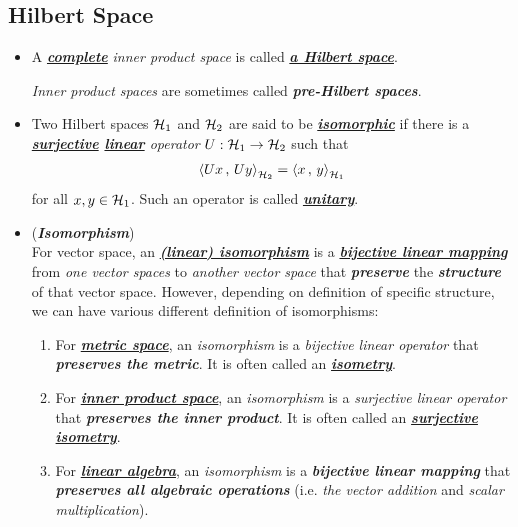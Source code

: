\documentclass[11pt]{article}
\begin{document}
\subsection{Hilbert Space}
\begin{itemize}
\item \begin{definition}
A \underline{\textbf{\emph{complete}}} \emph{inner product space} is called \underline{\emph{\textbf{a Hilbert space}}}. 

\emph{Inner product spaces} are sometimes called \emph{\textbf{pre-Hilbert spaces}}.
\end{definition}

\item \begin{definition}
Two Hilbert spaces ${\mathcal H}_1$ and ${\mathcal H}_2$ are said to be \underline{\emph{\textbf{isomorphic}}} if there is a \emph{\textbf{\underline{surjective} \underline{linear}} operator} $U: {\mathcal H}_1 \rightarrow {\mathcal H}_2$ such that 
\begin{align*}
\left\langle Ux\,,\, Uy \right\rangle_{{\mathcal H}_2} = \left\langle x\,,\, y \right\rangle_{{\mathcal H}_1}
\end{align*}  for all $x, y \in {\mathcal H}_1$. Such an operator is called \underline{\emph{\textbf{unitary}}}.
\end{definition}

\item \begin{remark} (\emph{\textbf{Isomorphism}})\\
For vector space, an \underline{\emph{\textbf{(linear) isomorphism}}} is a \underline{\emph{\textbf{bijective linear mapping}}} from \emph{one vector spaces} to \emph{another vector space} that \emph{\textbf{preserve}} the \emph{\textbf{structure}} of that vector space. However, depending on definition of specific structure, we can have various different definition of isomorphisms:
\begin{enumerate}
\item For \underline{\emph{\textbf{metric space}}}, an \emph{isomorphism} is a \emph{bijective linear operator} that \emph{\textbf{preserves the metric}}. It is often called an \underline{\emph{\textbf{isometry}}}.
\item For \underline{\emph{\textbf{inner product space}}}, an \emph{isomorphism} is a \emph{surjective linear operator} that \emph{\textbf{preserves the inner product}}. It is often called an \underline{\emph{\textbf{surjective isometry}}}.
\item For \underline{\emph{\textbf{linear algebra}}}, an \emph{isomorphism} is a \emph{\textbf{bijective linear mapping}} that \emph{\textbf{preserves all algebraic operations}} (i.e. \emph{the vector addition} and \emph{scalar multiplication}).
\end{enumerate}


\end{remark}
\end{itemize}
\end{document}
